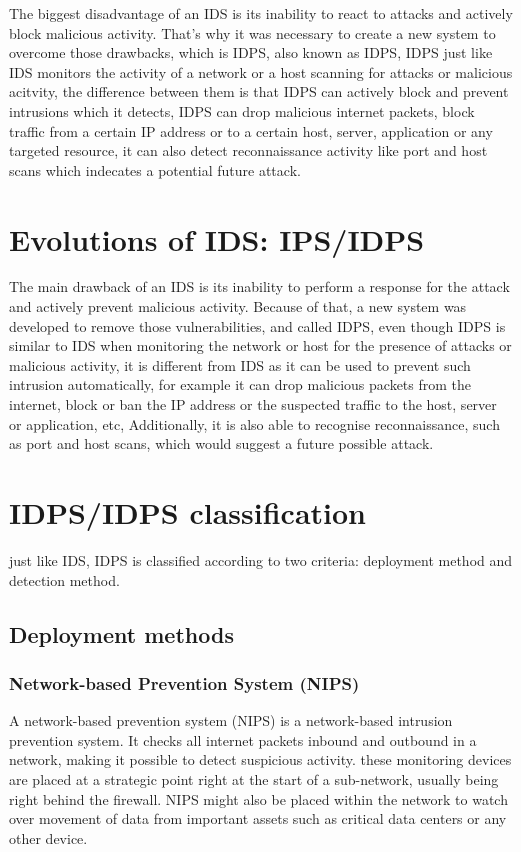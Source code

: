 The biggest disadvantage of an IDS is its inability to react to attacks and actively block malicious activity. That's why it was necessary to create a new system to overcome those drawbacks, which is IDPS, also known as IDPS, IDPS just like IDS monitors the activity of a network or a host scanning for attacks or malicious acitvity, the difference between them is that IDPS can actively block and prevent intrusions which it detects, IDPS can drop malicious internet packets, block traffic from a certain IP address or to a certain host, server, application or any targeted resource, it can also detect reconnaissance activity like port and host scans which indecates a potential future attack.

\section{Evolutions of IDS: IPS/IDPS}
The main drawback of an IDS is its inability to perform a response for the attack and actively prevent malicious activity. Because of that, a new system was developed to remove those vulnerabilities, and called IDPS, even though IDPS is similar to IDS when monitoring the network or host for the presence of attacks or malicious activity, it is different from IDS as it can be used to prevent such intrusion automatically, for example it can drop malicious packets from the internet, block or ban the IP address or the suspected traffic to the host, server or application, etc, Additionally, it is also able to recognise reconnaissance, such as port and host scans, which would suggest a future possible attack. \cite{NIST-IDPS}



\section{IDPS/IDPS classification}
just like IDS, IDPS is classified according to two criteria: deployment method and detection method.

\subsection{Deployment methods}
\subsubsection{Network-based Prevention System (NIPS)}
A network-based prevention system (NIPS) is a network-based intrusion prevention system. It checks all internet packets inbound and outbound in a network, making it possible to detect suspicious activity. these monitoring devices are placed at a strategic point right at the start of a sub-network, usually being right behind the firewall. NIPS might also be placed within the network to watch over movement of data from important assets such as critical data centers or any other device. \cite{IBM-IPS}

